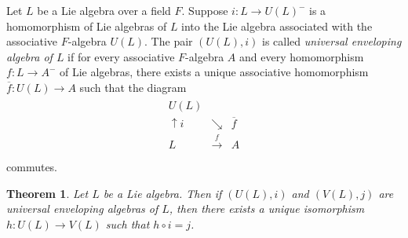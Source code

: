 \documentclass[12pt,MSc]{muthesis_2023}
\theoremstyle{plain}%
\newtheorem{Theorem}[FactCounter]{Theorem} %
\theoremstyle{definition}
\theoremstyle{remark}
\begin{document}
Let $L$ be a Lie algebra over a field $F$. Suppose $i: L\rightarrow U(L)^-$ is a homomorphism of Lie algebras of $L$ into the Lie algebra associated with the associative $F$-algebra $U(L)$. The pair $(U(L), i)$ is called \textit{universal enveloping algebra of $L$} if for every associative $F$-algebra $A$ and every homomorphism $f:L\rightarrow A^-$ of Lie algebras, there exists a unique associative homomorphism $\overline{f}:U(L)\rightarrow A$ such that the diagram
\begin{align*}
\begin{matrix}
U(L)&&\\
\uparrow i&\searrow&\overline{f}\\
L&\xrightarrow[]{f}&A
\end{matrix}
\end{align*}
commutes.

\begin{Theorem}\label{universalenvelopingalgebraunique}
Let $L$ be a Lie algebra. Then if $(U(L), i)$ and $(V(L), j)$ are universal enveloping algebras of $L$, then there exists a unique isomorphism $h: U(L) \rightarrow V(L)$ such that $h\circ i=j$.
\end{Theorem}
\end{document}
